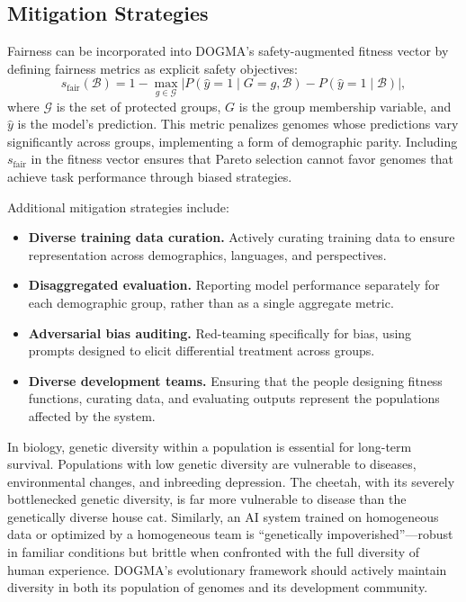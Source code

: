 \subsection{Mitigation Strategies}

\begin{dogmadef}
Fairness can be incorporated into DOGMA's safety-augmented fitness vector by defining fairness metrics as explicit safety objectives:
\begin{equation}
  s_{\text{fair}}(\mathcal{B}) = 1 - \max_{g \in \mathcal{G}} \bigl| P(\hat{y} = 1 \mid G = g, \mathcal{B}) - P(\hat{y} = 1 \mid \mathcal{B}) \bigr|,
\end{equation}
where $\mathcal{G}$ is the set of protected groups, $G$ is the group membership variable, and $\hat{y}$ is the model's prediction.
This metric penalizes genomes whose predictions vary significantly across groups, implementing a form of demographic parity.
Including $s_{\text{fair}}$ in the fitness vector ensures that Pareto selection cannot favor genomes that achieve task performance through biased strategies.
\end{dogmadef}

Additional mitigation strategies include:
\begin{itemize}[leftmargin=1.5em]
  \item \textbf{Diverse training data curation.} Actively curating training data to ensure representation across demographics, languages, and perspectives.
  \item \textbf{Disaggregated evaluation.} Reporting model performance separately for each demographic group, rather than as a single aggregate metric.
  \item \textbf{Adversarial bias auditing.} Red-teaming specifically for bias, using prompts designed to elicit differential treatment across groups.
  \item \textbf{Diverse development teams.} Ensuring that the people designing fitness functions, curating data, and evaluating outputs represent the populations affected by the system.
\end{itemize}

\begin{bioinsight}
In biology, genetic diversity within a population is essential for long-term survival.
Populations with low genetic diversity are vulnerable to diseases, environmental changes, and inbreeding depression.
The cheetah, with its severely bottlenecked genetic diversity, is far more vulnerable to disease than the genetically diverse house cat.
Similarly, an AI system trained on homogeneous data or optimized by a homogeneous team is ``genetically impoverished''---robust in familiar conditions but brittle when confronted with the full diversity of human experience.
DOGMA's evolutionary framework should actively maintain diversity in both its population of genomes and its development community.
\end{bioinsight}

